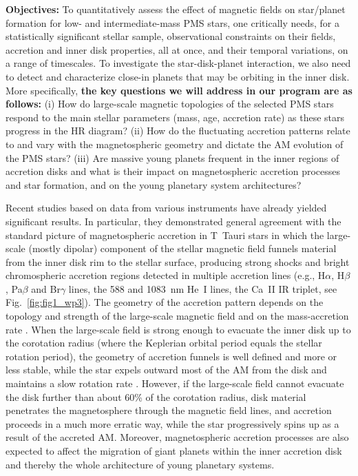 \documentclass[
    traditabstract,
    longauth,
    onecolumn,
]{aa}
\def \spi{SPIRou}
\def \esp{ESPaDOnS}
\begin{document}
{\bf \noindent Objectives:}
To quantitatively assess the effect of magnetic fields on star/planet formation for low- and intermediate-mass PMS stars, one critically needs, for a statistically significant stellar sample, observational constraints on their fields, accretion and inner disk properties, all at once, and their temporal variations, on a range of timescales. To investigate the star-disk-planet interaction, we also need to detect and characterize close-in planets that may be orbiting in the inner disk.  More specifically, {\bf the key questions we will address in our program are as follows:} (i) How do large-scale magnetic topologies of the selected PMS stars respond to the main stellar parameters (mass, age, accretion rate) as these stars progress in the HR diagram?  (ii) How do the fluctuating accretion patterns relate to and vary with the magnetospheric geometry and dictate the AM evolution of the PMS stars?  (iii) Are massive young planets frequent in the inner regions of accretion disks and what is their impact on magnetospheric accretion processes and star formation, and on the young planetary system architectures?  

Recent studies based on data from various instruments \citep[including \esp\ at optical wavelengths and \spi\ in near IR at CFHT, e.g.,][]{Donati2013,Yu2019,Finociety2023,Cristofari2025} have already yielded significant results.  In particular, they 
 demonstrated general agreement with the standard picture of magnetospheric accretion in T~Tauri stars in which the large-scale (mostly dipolar) component of the stellar magnetic field funnels material from the inner disk rim to the stellar surface, 
producing strong shocks and bright chromospheric accretion regions detected in multiple accretion lines (e.g.,  H$\alpha$, H$\beta$, Pa$\beta$ and Br$\gamma$ lines, the 588 and 1083~nm He~I lines, the Ca~II IR triplet, see Fig.~\ref{fig:fig1_wp3}). The geometry of the accretion pattern depends on the topology and strength of the large-scale magnetic field and on the mass-accretion rate \citep[e.g.,][]{Blinova2016,Romanova2025}.  When the large-scale field is strong enough to evacuate the inner disk up to the corotation radius (where the Keplerian orbital period equals the stellar rotation period), the geometry of accretion funnels is well defined and more or less stable, while the star expels outward most of the AM from the disk and maintains a slow rotation rate \citep[e.g.,][]{Zanni2013}.  However, if the large-scale field cannot evacuate the disk further than about 60\% of the corotation radius, disk material penetrates the magnetosphere through the magnetic field lines, and accretion proceeds in a much more erratic way, while the star progressively spins up as a result of the accreted AM.  Moreover, magnetospheric accretion processes are also expected to affect the migration of giant planets within the inner accretion disk \citep[e.g.,][]{Romanova2026} and thereby the whole architecture of young planetary systems.  
\end{document}
